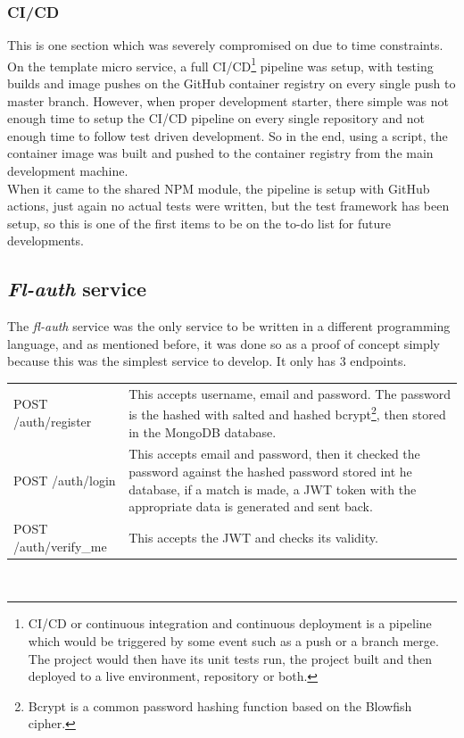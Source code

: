 \documentclass{article}
\newcommand{\vspaceconst}{-2ex}
\begin{document}
\begin{multicols}{2}
\subsubsection{CI/CD}
\vspace{\vspaceconst}

This is one section which was severely compromised on due to time constraints. On the template micro service, a full CI/CD\footnote{CI/CD or continuous integration and continuous deployment is a pipeline which would be triggered by some event such as a push or a branch merge. The project would then have its unit tests run, the project built and then deployed to a live environment, repository or both.} pipeline was setup, with testing builds and image pushes on the GitHub container registry on every single push to master branch. However, when proper development starter, there simple was not enough time to setup the CI/CD pipeline on every single repository and not enough time to follow test driven development. So in the end, using a script, the container image was built and pushed to the container registry from the main development machine.\\
When it came to the shared NPM module, the pipeline is setup with GitHub actions, just again no actual tests were written, but the test framework has been setup, so this is one of the first items to be on the to-do list for future developments.\\

\subsection{\textit{Fl-auth} service}
\vspace{\vspaceconst}
The \textit{fl-auth} service was the only service to be written in a different programming language, and as mentioned before, it was done so as a proof of concept simply because this was the simplest service to develop. It only has 3 endpoints.\\

\begingroup
\centering
\begin{tabular}{p{2.5cm} p{4.5cm}}
  POST /auth/register & This accepts username, email and password. The password is the hashed with salted and hashed bcrypt\footnote{Bcrypt is a common password hashing function based on the Blowfish cipher.}, then stored in the MongoDB database.\\
  POST /auth/login & This accepts email and password, then it checked the password against the hashed password stored int he database, if a match is made, a JWT token with the appropriate data is generated and sent back.\\
  POST /auth/verify\_me & This accepts the JWT and checks its validity.\\
\end{tabular}
~\label{table:flAuthEndpoints}
\endgroup


\end{multicols}
\end{document}
